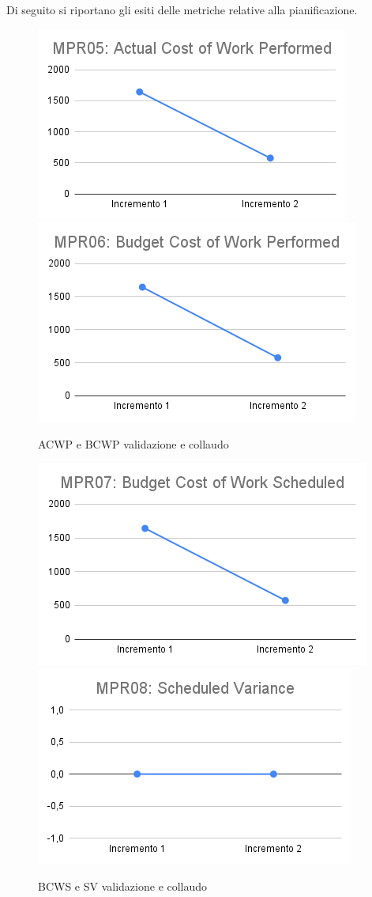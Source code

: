 \newpage
{}
Di seguito si riportano gli esiti delle metriche relative alla pianificazione.
\begin{figure}[h!]
	\includegraphics[scale=0.6]{Immagini/ACWP_Validazione.png}\quad
	\includegraphics[scale=0.6]{Immagini/BCWP_Validazione.png}
	\caption{ACWP e BCWP validazione e collaudo}
	\label{fig:BCWP_Validazione}
\end{figure}
\begin{figure}[h!]
	\includegraphics[scale=0.5]{Immagini/BCWS_Validazione.png}\quad
	\includegraphics[scale=0.6]{Immagini/SV_Validazione.png}
	\caption{BCWS e SV validazione e collaudo}
	\label{fig:SV_Validazione}
\end{figure}
